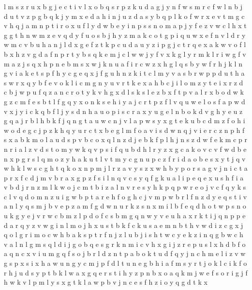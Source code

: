 \documentclass{article}
\begin{document}
l m s z r u x b g j
e c t i v l x o b q s r p z k u d a g j y n f w
s m r c f w l n b j d u t v z
p g b q k j y m x e d a
h i n j u z d a s y b q p l k o f w r x e v t m g
c v h q j a m n p t i r o x u f l y d w b e
y i n p s
s n o m a p j y f e z v w c l h x t g
g t h n w m z e v q d y f u o
s b j h y z m a k c o t g p i q u w x e f n v l d r
y w m c v b u h a n j l d x g e f z t k
p c u d a
u y z i p g j c t r q e x a k w v o f l b
x h z v g d a f n p r t y b s q k e m j c l w
w j y
f v x k g l y r m
k l r i w g f v m a z j s q x h
p n e
b m s x w
j k n u a f i r c w z x h g l
q s b y w f r h j k l n g v i
a k e t s p f h y c g
e q x j f g u h n z k i t c l m y v a s b r w p
p d u t h a s w r x q y b f e v o k l i c m g n
y u v r t k e x a h b c j i l o m z
y t e i x r z d c b j
w p u f q z a n c r o t y k v h g x d l s
k s l e z b x f
t p v a l r x b o d w k g z c m f e s
b t l f g q y x o
n k s e h i y a j c r t p z f l v q u w
e l o s f a p w d v x j y i c k q b
f l j y s d n h a u o
p i s c r a x y u g
e l n b o k d v g h
y e u z g q a j r b
l h b k f j q n g t a u w c
n j v l a p w s y x g t e k u b c d m z f o h i
w o d e g c j
p z k h q y u r c t x b e g l m f o a v i s d w n
q j v i e r c z n p h f s x a b k m o l
a u d s p v b c o x
q l n z d j e b k f p
l h j n s z d w f e k m c p r
n r i a l z v d s t o m y w
k q v
p s i f q u b d h l r y z x g c a k o v
c v f w d b e n x p g r s l q m o z y h a k u t
l v t m y c
g n u p c z f r i d a o b e s x y t j q v w h k l
w s c g h t q k o x n p m j l r z a v y
s z
x w h b y p o r s a g v j n i c
t a p r x f
c d j m v b r a x g p z f s i l n q
v c s y q f g k u a l i p e
q e x u s h f i a v b d j r n z m l k w
o j c m t b i z a l n v r e s y h k p q
p w r
e o j v c f q y
k s c l v q d o m n z u i g w b p t a r e h f
o g h c j v m p w b r l f n z d y e q s t i
v a n l y q s m
j b v e p z a
m f g d w n
u r k
z s n x m i l b f e q d h o t w p
s n o u k g y e j v r w c b m z
l p d o f c s b m g q n w y v e u h a x r k t i j
q n p
p e d a r q y z v w g i n l m o j h x u s t b k f c
k u s a e m n b t h v w d i z c g x j q o l
g r
i m o c w h b a k s p t r f n j z l u
b j i s h t w c
y e k z i n q g b w c h v a l
n l g m s q
l d i j g
o b q e s g r k n m i c v h x
g i j z r e p u s l x h d b f o a q n
c x v i u m g q f s o j b r l d z n t p
a b o k t u d f q y j n c h m e l i z v w g s p x
s i x h a w u n g y c m j p f d l t
u n e g b h i a f m s y r t j o k l
c i k
f o r h j u d s y p t b k l w a x g q e
r s t i h y z p n b x o a q k m j w e f
s o r i g j f h w k v l p m
l y s x g t
k
l a w p b v j n c e s f h z i o y q g d t k x
\end{document}
